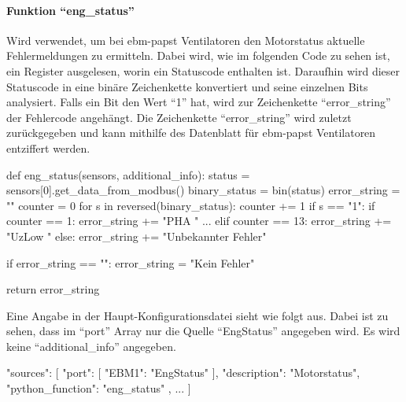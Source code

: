 \paragraph{Funktion \enquote{eng\_status}}
Wird verwendet, um bei ebm-papst Ventilatoren den Motorstatus \bzw aktuelle Fehlermeldungen zu ermitteln. Dabei wird, wie im folgenden Code zu sehen ist, ein Register ausgelesen, worin ein Statuscode enthalten ist. Daraufhin wird dieser Statuscode in eine binäre Zeichenkette konvertiert und seine einzelnen Bits analysiert. Falls ein Bit den Wert \enquote{1} hat, wird zur Zeichenkette \enquote{error\_string} der Fehlercode angehängt. Die Zeichenkette \enquote{error\_string} wird zuletzt zurückgegeben und kann mithilfe des Datenblatt für ebm-papst Ventilatoren \cite[vgl.][119]{ebmpapst:2020} entziffert werden. 

\begin{pythoncode}
def eng_status(sensors, additional_info):
	status = sensors[0].get_data_from_modbus()
	binary_status = bin(status)
	error_string = ""
	counter = 0
	for s in reversed(binary_status):
		counter += 1
		if s == "1":
			if counter == 1:
				error_string += "PHA "
			...
			elif counter == 13:
				error_string += "UzLow "
			else:
				error_string += "Unbekannter Fehler"
			
	if error_string == "":
		error_string = "Kein Fehler"
	
	return error_string
\end{pythoncode}

Eine Angabe in der Haupt-Konfigurationsdatei sieht wie folgt aus. Dabei ist zu sehen, dass im \enquote{port} Array nur die Quelle \enquote{EngStatus} angegeben wird. Es wird keine \enquote{additional\_info} angegeben.

\begin{jsoncode}
"sources": [
	{
		"port": [
			{"EBM1": "EngStatus"}
		],
		"description": "Motorstatus",
		"python_function": "eng_status"
	},
	...
]
\end{jsoncode}



